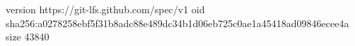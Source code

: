 version https://git-lfs.github.com/spec/v1
oid sha256:a0278258ebf5f31b8adc88e489dc34b1d06eb725c0ae1a45418ad09846ecee4a
size 43840
